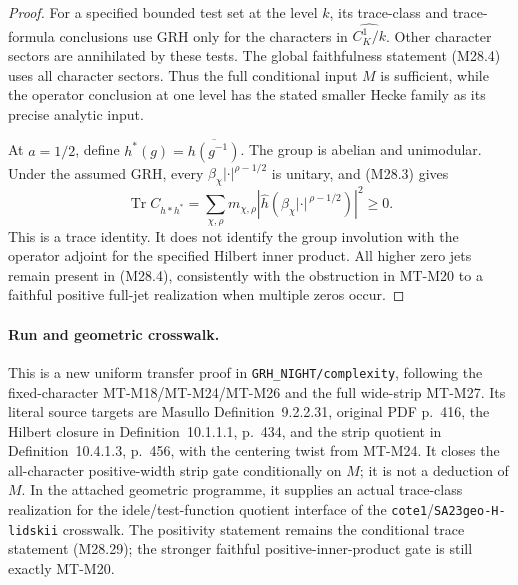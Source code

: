 \begin{proof}
For a specified bounded test set
at the level \(k\), its trace-class
and trace-formula conclusions use
GRH only for the characters in
\(\widehat{C_K^1/k}\). Other
character sectors are annihilated
by these tests. The global
faithfulness statement (M28.4)
uses all character sectors.
Thus the full conditional input
\(M\) is sufficient, while the
operator conclusion at one level
has the stated smaller Hecke
family as its precise analytic
input.

At \(a=1/2\), define
\(h^*(g)=\overline{h(g^{-1})}\).
The group is abelian and
unimodular. Under the assumed
GRH, every
\(\beta_\chi|\cdot|^{\rho-1/2}\)
is unitary, and (M28.3) gives
\[
       \operatorname{Tr} C_{h*h^*}
          =\sum_{\chi,\rho}
                 m_{\chi,\rho}
                 |\widehat h(
                    \beta_\chi|\cdot|^{\,\rho-1/2})|^2
          \ge0.                                               \tag{M28.29}
\]
This is a trace identity. It
does not identify the group
involution with the operator
adjoint for the specified
Hilbert inner product.
All higher zero jets remain
present in (M28.4), consistently
with the obstruction in MT-M20
to a faithful positive
full-jet realization when
multiple zeros occur.
\end{proof}

\paragraph{Run and geometric crosswalk.}
This is a new uniform transfer proof in
\texttt{GRH\_NIGHT/complexity}, following the fixed-character
MT-M18/MT-M24/MT-M26 and the full wide-strip MT-M27.
Its literal source targets are Masullo
Definition~9.2.2.31, original PDF p.~416, the Hilbert
closure in Definition~10.1.1.1, p.~434, and the
strip quotient in Definition~10.4.1.3, p.~456,
with the centering twist from MT-M24. It closes
the all-character positive-width strip gate
conditionally on \(M\); it is not a deduction
of \(M\). In the attached geometric programme,
it supplies an actual trace-class realization
for the idele/test-function quotient interface
of the \texttt{cote1}/\texttt{SA23geo-H-lidskii}
crosswalk. The positivity statement remains
the conditional trace statement (M28.29);
the stronger faithful positive-inner-product
gate is still exactly MT-M20.
